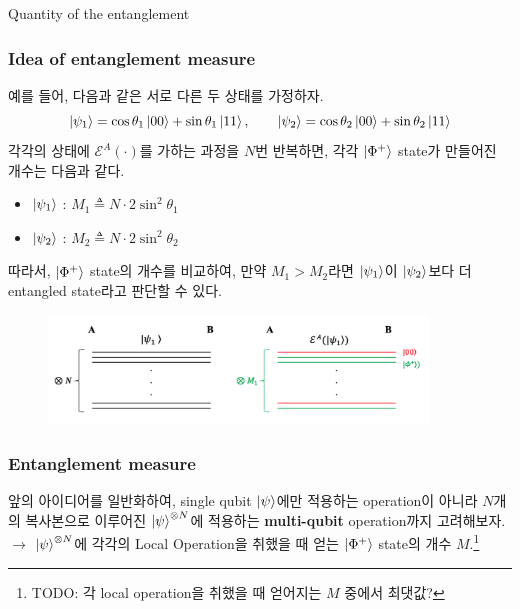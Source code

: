 \documentclass[9pt]{beamer}
\begin{document}
\begin{section}{Quantity of the entanglement}
        \begin{frame}
            \frametitle{Idea of entanglement measure}
            예를 들어, 다음과 같은 서로 다른 두 상태를 가정하자.
            \begin{equation*}
                \ket{\psi_1} = \cos \theta_1 \ket{00} + \sin \theta_1 \ket{11},\qquad \ket{\psi_2} = \cos \theta_2 \ket{00} + \sin \theta_2 \ket{11}
            \end{equation*}
            각각의 상태에 $\mathcal E^A(\cdot)$를 가하는 과정을 $N$번 반복하면, 각각 $\ket{\Phi^+}$ state가 만들어진 개수는 다음과 같다.
            \begin{itemize}
                \item $\ket{\psi_1}$ : $M_1 \triangleq N \cdot 2 \sin^2 \theta_1$
                \item $\ket{\psi_2}$ : $M_2 \triangleq N \cdot 2 \sin^2 \theta_2$
            \end{itemize}
            따라서, $\ket{\Phi^+}$ state의 개수를 비교하여, 만약 $M_1 > M_2$라면 $\ket{\psi_1}$이 $\ket{\psi_2}$보다 더 entangled state라고 판단할 수 있다.
            \begin{figure}
                \centering
                \includegraphics[width=0.9\textwidth]{image/L7_entanglement_measure_exp.png}
            \end{figure}
        \end{frame}

        \begin{frame}
            \frametitle{Entanglement measure}
            앞의 아이디어를 일반화하여, single qubit $\ket{\psi}$에만 적용하는 operation이 아니라 $N$개의 복사본으로 이루어진 $\ket{\psi}^{\otimes N}$에 적용하는 \textbf{multi-qubit} operation까지 고려해보자.\\
            \vspace{0.2cm}
            $\rightarrow$ $\ket{\psi}^{\otimes N}$에 각각의 Local Operation을 취했을 때 얻는 $\ket{\Phi^+}$ state의 개수 $M$.\footnote{TODO: 각 local operation을 취했을 때 얻어지는 $M$ 중에서 최댓값?}


\end{frame}
\end{section}
\end{document}
